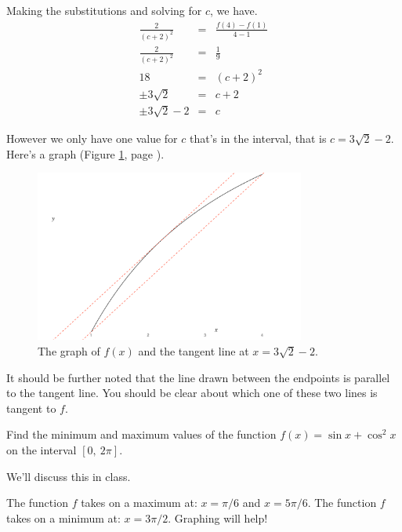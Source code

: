 \documentclass[12pt,addpoints, answers, fleqn]{exam}
\begin{document}
\begin{questions}
\begin{solution}
Making the substitutions and solving for $c$, we have.
\begin{eqnarray*}
\frac{2}{\left(c+2\right)^2} &=& \frac{f\left(4\right) - f\left(1\right)}{4-1}\\
\frac{2}{\left(c+2\right)^2} &=& \frac{1}{9}\\
18 &=& \left(c+2\right)^2\\
\pm 3 \sqrt{2} &=& c+2\\
\pm 3 \sqrt{2} - 2 &=& c
\end{eqnarray*}

However we only have one value for $c$ that's in the interval, that is $c = 3 \sqrt{2} - 2$. Here's a graph (Figure \ref{fig:graph2104}, page \pageref{fig:graph2104}).
\end{solution}
\begin{figure}[htbp] %
   \centering
   \includegraphics[width=3.5in]{./graphics/graph2104.pdf} 
   \caption{The graph of $f\left( x \right)$ and the tangent line at $x = 3 \sqrt{2} - 2$.}
   \label{fig:graph2104}
\end{figure}

It should be further noted that the line drawn between the endpoints is parallel to the tangent line. You should be clear about which one of these two lines is tangent to $f$.





\question Find the minimum and maximum values of the function $f\left(x\right) = \sin x + \cos^2 x$ on the interval $\left[ 0, \ 2 \pi \right]$.

\begin{solution}
We'll discuss this in class.

The function $f$ takes on a maximum at: $x= \pi/6$ and $x= 5\pi/6$. The function $f$ takes on a minimum at: $x= 3\pi/2$.  Graphing will help!
\end{solution}




\end{questions}
\end{document}
